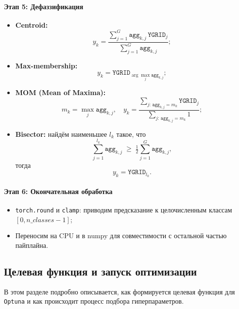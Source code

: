 \paragraph{Этап 5: Дефаззификация}  
\begin{itemize}
  \item {\bf Centroid:}  
    $$
      y_k
      = \frac{\sum_{j=1}^G \texttt{agg}_{k,j}\,\texttt{YGRID}_j}
             {\sum_{j=1}^G \texttt{agg}_{k,j}};
    $$
  \item {\bf Max-membership:}  
    $$
      y_k
      = \texttt{YGRID}_{\displaystyle\arg\max_j \texttt{agg}_{k,j}};
    $$
  \item {\bf MOM (Mean of Maxima):}  
    $$
      m_k = \max_j \texttt{agg}_{k,j},\quad
      y_k
      = \frac{\sum_{j:\,\texttt{agg}_{k,j}=m_k} \texttt{YGRID}_j}
             {\sum_{j:\,\texttt{agg}_{k,j}=m_k} 1};
    $$
  \item {\bf Bisector:}  
    найдём наименьшее $l_k$ такое, что
    $$
      \sum_{j=1}^{l_k} \texttt{agg}_{k,j}
      \;\ge\;
      \tfrac12 \sum_{j=1}^G \texttt{agg}_{k,j},
    $$
    тогда
    $$
      y_k = \texttt{YGRID}_{l_k}.
    $$
\end{itemize}

\paragraph{Этап 6: Окончательная обработка}
\begin{itemize}
  \item \texttt{torch.round} и \texttt{clamp}: приводим предсказание к целочисленным классам \([0, n\_classes-1]\);
  \item Переносим на CPU и в numpy для совместимости с остальной частью пайплайна.
\end{itemize}


\subsection{Целевая функция и запуск оптимизации}

В этом разделе подробно описывается, как формируется целевая функция для \texttt{Optuna} и как происходит процесс подбора гиперпараметров.

